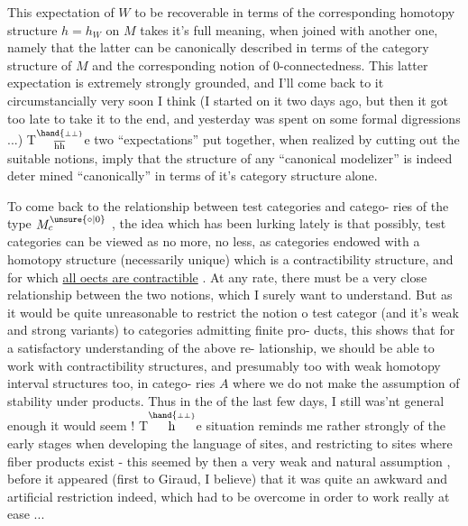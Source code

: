 
This expectation of $W$ to be recoverable in terms of the corresponding
homotopy structure $h = h_{W}$ on $M$ takes it's full meaning,  when joined with
another one,   namely that the latter can be canonically described in
terms of the category structure of $M$  and the corresponding notion of
0-connectedness.  This latter expectation is extremely strongly grounded,
and I'll come back to it circumstancially very soon I think  (I started
on it two days ago,  but then it got too late to take it to the end, and
yesterday was spent on some formal digressions ...)  T$\overset{\hand{\scriptscriptstyle\perp\perp}}{\over{\mathrm h}{\mathrm h}}$e two ``expectations''
put together,  when realized by   cutting out the suitable notions,
 imply that the structure of any ``canonical modelizer'' is indeed deter%
mined ``canonically'' in terms of it's category structure alone.

To come back to the relationship between test categories and catego-%
ries of the type $M^{\unsure{\circ|0}}_{c}$ ,  the idea which has been lurking  lately is
that possibly,  test categories can be viewed as no more,  no less,  as
categories endowed with  a homotopy structure (necessarily
unique)  which is a contractibility structure,  and for which \uline{all oects
are contractible} .  At any rate,  there must be a very close relationship
between the two notions,  which I surely want to understand.  But as it
would be quite unreasonable to restrict the notion o  test categor
(and it's weak and strong variants) to categories admitting finite pro-%
ducts,  this shows that for a satisfactory understanding of the above re-%
lationship,  we should be able to work with contractibility structures,
and presumably too with weak homotopy interval structures too,  in catego-%
ries $A$ where we do not make the assumption of stability under products.
Thus in the   of the last few days,  I still was'nt general enough
it would seem !  T$\overset{\hand{\scriptscriptstyle\perp\perp}}{\mathrm h}$e situation reminds me rather strongly of the early
stages when developing the language of sites,  and restricting to sites
where fiber products exist  -  this seemed by then a very weak and natural
assumption ,  before it appeared (first to Giraud, I believe) that
it was quite an awkward and artificial restriction indeed,  which had to
be overcome in order to work really at ease ...

